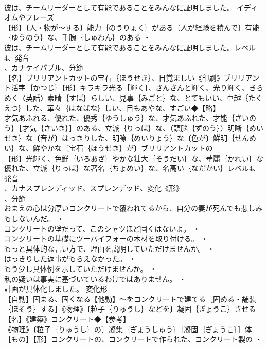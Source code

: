 \documentclass[8pt]{extreport}
\begin{document}
\begin{CJK}{UTF8}{min}
\\	彼は、チームリーダーとして有能であることをみんなに証明しました。	イディオムやフレーズ 
\\	【形】〔人・物が～する〕能力｛のうりょく｝がある〔人が経験を積んで〕有能｛ゆうのう｝な、手腕｛しゅわん｝のある ・
\\	彼は、チームリーダーとして有能であることをみんなに証明しました。レベル4、発音
\\	、カナケイパブル、分節
\\	【名】ブリリアントカットの宝石｛ほうせき｝、目覚ましい《印刷》ブリリアント活字｛かつじ｝【形】キラキラ光る［輝く］、さんさんと輝く、光り輝く、きらめく〈英話〉素晴｛すば｝らしい、見事｛みごと｝な、とてもいい、卓越｛たくえつ｝した、華々｛はなばな｝しい、目もあやな、すごい◆【略】
\\	才気あふれる、優れた、優秀｛ゆうしゅう｝な、才気あふれた、才能｛さいのう｝［才気｛さいき｝］のある、立派｛りっぱ｝な、（頭脳｛ずのう｝）明晰｛めいせき｝な〔音が〕はっきりした、明瞭｛めいりょう｝な〔色が〕鮮明｛せんめい｝な、鮮やかな〔宝石｛ほうせき｝が〕ブリリアントカットの
\\	【形】光輝く、色鮮｛いろあざ｝やかな壮大｛そうだい｝な、華麗｛かれい｝な優れた、立派｛りっぱ｝な著名｛ちょめい｝な、名高い｛なだかい｝レベル4、発音
\\	、カナスプレンディッド、スプレンデッド、変化《形》
\\	、分節
\\	おまえの心は分厚いコンクリートで覆われてるから、自分の妻が死んでも悲しみもしないんだ。 ・
\\	コンクリートの壁だって、このシャツほど固くはないよ。 ・
\\	コンクリートの基礎にツーバイフォーの木材を取り付ける。 ・
\\	もっと具体的な言い方で、理由を説明していただけませんか。 ・
\\	はっきりした返事がもらえなかった。 ・
\\	もう少し具体例を示していただけませんか。 ・
\\	私の疑いは事実に基づいているわけではありません。 ・
\\	計画が具体化しました。	変化形 
\\	【自動】固まる、固くなる【他動】～をコンクリートで建てる［固める・舗装｛ほそう｝する］《物理》〔粒子｛りゅうし｝などを〕凝固｛ぎょうこ｝させる【名】《建築》コンクリート◆【参考】
\\	《物理》〔粒子｛りゅうし｝の〕凝集｛ぎょうしゅう｝［凝固｛ぎょうこ｝］体［もの］【形】コンクリートの、コンクリートで作られた、コンクリート製の ・

\end{CJK}
\end{document}
